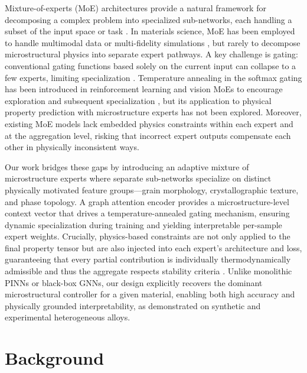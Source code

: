 \documentclass{article}
\begin{document}
Mixture-of-experts (MoE) architectures provide a natural framework for decomposing a complex problem into specialized sub-networks, each handling a subset of the input space or task \cite{jacobs_moe_1991, shazeer_gshard_2017}. In materials science, MoE has been employed to handle multimodal data or multi-fidelity simulations \cite{wu_moe_multifidelity_2021, du_hybrid_experts_2022}, but rarely to decompose microstructural physics into separate expert pathways. A key challenge is gating: conventional gating functions based solely on the current input can collapse to a few experts, limiting specialization \cite{eigen_gating_collapse_2013}. Temperature annealing in the softmax gating has been introduced in reinforcement learning and vision MoEs to encourage exploration and subsequent specialization \cite{xie_sparse_moe_annealing_2021, fedus_switch_transformers_2022}, but its application to physical property prediction with microstructure experts has not been explored. Moreover, existing MoE models lack embedded physics constraints within each expert and at the aggregation level, risking that incorrect expert outputs compensate each other in physically inconsistent ways.

Our work bridges these gaps by introducing an adaptive mixture of microstructure experts where separate sub-networks specialize on distinct physically motivated feature groups—grain morphology, crystallographic texture, and phase topology. A graph attention encoder provides a microstructure-level context vector that drives a temperature-annealed gating mechanism, ensuring dynamic specialization during training and yielding interpretable per-sample expert weights. Crucially, physics-based constraints are not only applied to the final property tensor but are also injected into each expert's architecture and loss, guaranteeing that every partial contribution is individually thermodynamically admissible and thus the aggregate respects stability criteria \cite{ortiz_convex_physics_2020}. Unlike monolithic PINNs or black-box GNNs, our design explicitly recovers the dominant microstructural controller for a given material, enabling both high accuracy and physically grounded interpretability, as demonstrated on synthetic and experimental heterogeneous alloys.

\section{Background}
\end{document}
